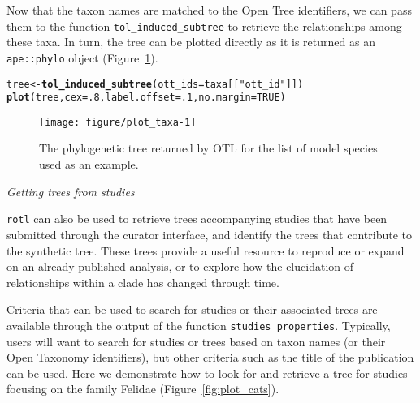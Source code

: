 \documentclass[12pt,letterpaper]{article}\usepackage[]{graphicx}\usepackage[]{color}
\makeatletter
\def\maxwidth{ %
  \ifdim\Gin@nat@width>\linewidth
    \linewidth
  \else
    \Gin@nat@width
  \fi
}
\newcommand{\hlnum}[1]{\textcolor[rgb]{0.686,0.059,0.569}{#1}}%
\newcommand{\hlstr}[1]{\textcolor[rgb]{0.192,0.494,0.8}{#1}}%
\newcommand{\hlstd}[1]{\textcolor[rgb]{0.345,0.345,0.345}{#1}}%
\newcommand{\hlkwb}[1]{\textcolor[rgb]{0.69,0.353,0.396}{#1}}%
\newcommand{\hlkwc}[1]{\textcolor[rgb]{0.333,0.667,0.333}{#1}}%
\newcommand{\hlkwd}[1]{\textcolor[rgb]{0.737,0.353,0.396}{\textbf{#1}}}%
\newenvironment{kframe}{%
 \def\at@end@of@kframe{}%
 \ifinner\ifhmode%
  \def\at@end@of@kframe{\end{minipage}}%
  \begin{minipage}{\columnwidth}%
 \fi\fi%
 \def\FrameCommand##1{\hskip\@totalleftmargin \hskip-\fboxsep
 \colorbox{shadecolor}{##1}\hskip-\fboxsep
     \hskip-\linewidth \hskip-\@totalleftmargin \hskip\columnwidth}%
 \MakeFramed {\advance\hsize-\width
   \@totalleftmargin\z@ \linewidth\hsize
   \@setminipage}}%
 {\par\unskip\endMakeFramed%
 \at@end@of@kframe}
\newenvironment{knitrout}{}{} %
\renewcommand{\subsection}[1]{%
\bigskip
\begin{center}
\begin{large}
\normalfont\itshape #1
\end{large}
\end{center}}
\makeatother
\begin{document}
Now that the taxon names are matched to the Open Tree identifiers, we can pass
them to the function \texttt{tol\_induced\_subtree} to retrieve the
relationships among these taxa. In turn, the tree can be plotted directly as it
is returned as an \texttt{ape::phylo} object (Figure~\ref{fig:plot_taxa}).

\begin{knitrout}
\color{fgcolor}\begin{kframe}
\begin{alltt}
\hlstd{tree} \hlkwb{<-} \hlkwd{tol_induced_subtree}\hlstd{(}\hlkwc{ott_ids} \hlstd{= taxa[[}\hlstr{"ott_id"}\hlstd{]])}
\hlkwd{plot}\hlstd{(tree,} \hlkwc{cex}\hlstd{=}\hlnum{.8}\hlstd{,} \hlkwc{label.offset}\hlstd{=}\hlnum{.1}\hlstd{,} \hlkwc{no.margin}\hlstd{=}\hlnum{TRUE}\hlstd{)}
\end{alltt}
\end{kframe}\begin{figure}
\texttt{[image: figure/plot\_taxa-1]} \caption[The phylogenetic tree returned by OTL for the list of model species used as an example]{The phylogenetic tree returned by OTL for the list of model species used as an example.}\label{fig:plot_taxa}
\end{figure}


\end{knitrout}

\subsection{Getting trees from studies}
\label{sec:get-tree-study}

\texttt{rotl} can also be used to retrieve trees accompanying studies that have
been submitted through the curator interface, and identify the trees that
contribute to the synthetic tree. These trees provide a useful resource to
reproduce or expand on an already published analysis, or to explore how the
elucidation of relationships within a clade has changed through time.

Criteria that can be used to search for studies or their associated trees are
available through the output of the function
\texttt{studies\_properties}. Typically, users will want to search for studies
or trees based on taxon names (or their Open Taxonomy identifiers), but other
criteria such as the title of the publication can be used. Here we demonstrate
how to look for and retrieve a tree for studies focusing on the family Felidae
(Figure~\ref{fig:plot_cats}).
\end{document}
